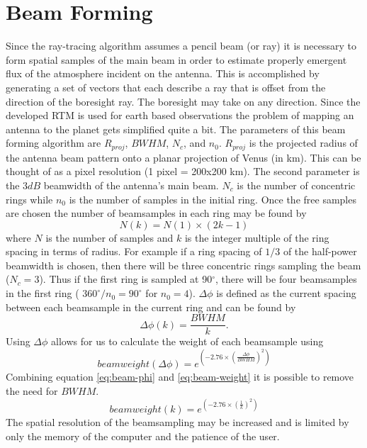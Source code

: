 \section{Beam Forming}

Since the ray-tracing algorithm assumes a pencil beam (or ray) it is necessary to form spatial samples of the main beam in order to estimate properly emergent flux of the atmosphere incident on the antenna. This is accomplished by generating a set of vectors that each describe a ray that is offset from the direction of the boresight ray. The boresight may take on any direction. Since the developed RTM is used for earth based observations the problem of mapping an antenna to the planet gets simplified quite a bit. The parameters of this beam forming algorithm are $R_{proj}$, $BWHM$, $N_c$, and $n_0$. $R_{proj}$ is the projected radius of the antenna beam pattern onto a planar projection of Venus (in km). This can be thought of as a pixel resolution (1 pixel = 200x200 km). The second parameter is the $3dB$ beamwidth of the antenna's main beam. $N_c$ is the number of concentric rings while $n_0$ is the number of samples in the initial ring. Once the free samples are chosen the number of beamsamples in each ring may be found by
\begin{equation}
N(k) = N(1) \times (2k-1)
\end{equation}
where $N$ is the number of samples and $k$ is the integer multiple of the ring spacing in terms of radius. For example if a ring spacing of $1/3$ of the half-power beamwidth is chosen, then there will be three concentric rings sampling the beam ($N_c=3$). Thus if the first ring is sampled at 90$^\circ$, there will be four beamsamples in the first ring ( $360^\circ / n_0 = 90^\circ$ for $n_0 = 4$). $\Delta\phi$ is defined as the current spacing between each beamsample in the current ring and can be found by
\begin{equation}\label{eq:beam-phi}
\Delta\phi(k) = \frac{BWHM}{k}.
\end{equation} 
Using $\Delta\phi$ allows for us to calculate the weight of each beamsample using
\begin{equation} \label{eq:beam-weight}
beamweight(\Delta\phi) = e^{\left( -2.76\times \left(\frac{\Delta\phi}{BWHM}\right)^2\right)}
\end{equation}
Combining equation \ref{eq:beam-phi} and \ref{eq:beam-weight} it is possible to remove the need for $BWHM$.
\begin{equation}
beamweight(k) = e^{\left( -2.76\times \left(\frac{1}{k}\right)^2\right)}
\end{equation}
The spatial resolution of the beamsampling may be increased and is limited by only the memory of the computer and the patience of the user. 